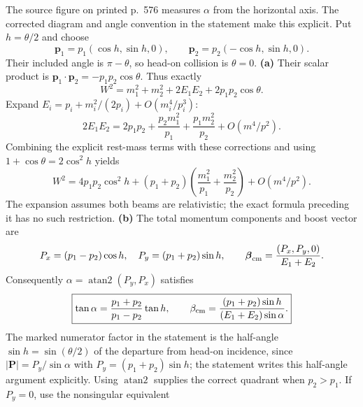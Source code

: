 \begin{center}
\end{center}
\solution
The source figure on printed p.~576 measures $\alpha$ from
the horizontal axis. The corrected diagram and angle convention
in the statement make this explicit. Put $h=\theta/2$ and choose
\[
\mathbf p_1=p_1(\cos h,\sin h,0),\qquad
\mathbf p_2=p_2(-\cos h,\sin h,0).
\]
Their included angle is $\pi-\theta$, so head-on collision is
$\theta=0$.
\textbf{(a)} Their scalar product is
$\mathbf p_1\cdot\mathbf p_2=-p_1p_2\cos\theta$. Thus exactly
\[
W^2=m_1^2+m_2^2+2E_1E_2+2p_1p_2\cos\theta.
\]
Expand $E_i=p_i+m_i^2/(2p_i)+O(m_i^4/p_i^3)$:
\[
2E_1E_2=2p_1p_2+\frac{p_2m_1^2}{p_1}
+\frac{p_1m_2^2}{p_2}+O(m^4/p^2).
\]
Combining the explicit rest-mass terms with these corrections and
using $1+\cos\theta=2\cos^2h$ yields
\[
\boxed{W^2=4p_1p_2\cos^2h+
(p_1+p_2)\left(\frac{m_1^2}{p_1}+\frac{m_2^2}{p_2}\right)
+O(m^4/p^2).}
\]
The expansion assumes both beams are relativistic; the exact
formula preceding it has no such restriction.
\textbf{(b)} The total momentum components and boost vector are
\[
P_x=(p_1-p_2)\cos h,\quad P_y=(p_1+p_2)\sin h,
\qquad\boldsymbol\beta_{\rm cm}=\frac{(P_x,P_y,0)}{E_1+E_2}.
\]
Consequently $\alpha=\operatorname{atan2}(P_y,P_x)$ satisfies
\[
\boxed{\tan\alpha=\frac{p_1+p_2}{p_1-p_2}\tan h,
\qquad\beta_{\rm cm}=\frac{(p_1+p_2)\sin h}
{(E_1+E_2)\sin\alpha}.}
\]
The marked numerator factor in the statement is the half-angle
$\sin h=\sin(\theta/2)$ of the departure from head-on incidence,
since $|\mathbf P|=P_y/\sin\alpha$ with $P_y=(p_1+p_2)\sin h$; the
statement writes this half-angle argument explicitly.
Using $\operatorname{atan2}$ supplies the correct quadrant when
$p_2>p_1$. If $P_y=0$, use the nonsingular equivalent

